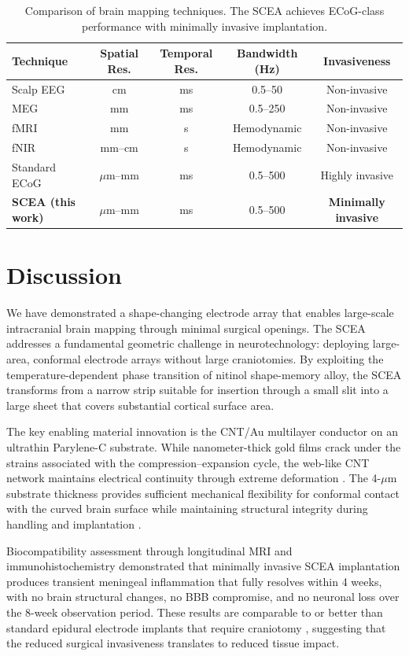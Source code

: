 \documentclass[11pt]{article}
\begin{document}
\begin{table}[H]
\centering
\caption{Comparison of brain mapping techniques. The SCEA achieves ECoG-class performance with minimally invasive implantation.}
\label{tab:comparison}
\begin{tabular}{lcccc}
\toprule
Technique & Spatial Res. & Temporal Res. & Bandwidth (Hz) & Invasiveness \\
\midrule
Scalp EEG & cm & ms & 0.5--50 & Non-invasive \\
MEG & mm & ms & 0.5--250 & Non-invasive \\
fMRI & mm & s & Hemodynamic & Non-invasive \\
fNIR & mm--cm & s & Hemodynamic & Non-invasive \\
Standard ECoG & $\mu$m--mm & ms & 0.5--500 & Highly invasive \\
\textbf{SCEA (this work)} & $\mu$m--mm & ms & 0.5--500 & \textbf{Minimally invasive} \\
\bottomrule
\end{tabular}
\end{table}

\section{Discussion}

We have demonstrated a shape-changing electrode array that enables large-scale intracranial brain mapping through minimal surgical openings. The SCEA addresses a fundamental geometric challenge in neurotechnology: deploying large-area, conformal electrode arrays without large craniotomies. By exploiting the temperature-dependent phase transition of nitinol shape-memory alloy, the SCEA transforms from a narrow strip suitable for insertion through a small slit into a large sheet that covers substantial cortical surface area.

The key enabling material innovation is the CNT/Au multilayer conductor on an ultrathin Parylene-C substrate. While nanometer-thick gold films crack under the strains associated with the compression--expansion cycle, the web-like CNT network maintains electrical continuity through extreme deformation \citep{cnt_electronics2013}. The 4-$\mu$m substrate thickness provides sufficient mechanical flexibility for conformal contact with the curved brain surface while maintaining structural integrity during handling and implantation \citep{parylene_biomed2008}.

Biocompatibility assessment through longitudinal MRI and immunohistochemistry demonstrated that minimally invasive SCEA implantation produces transient meningeal inflammation that fully resolves within 4 weeks, with no brain structural changes, no BBB compromise, and no neuronal loss over the 8-week observation period. These results are comparable to or better than standard epidural electrode implants that require craniotomy \citep{mri_biocompat2015}, suggesting that the reduced surgical invasiveness translates to reduced tissue impact.
\end{document}
